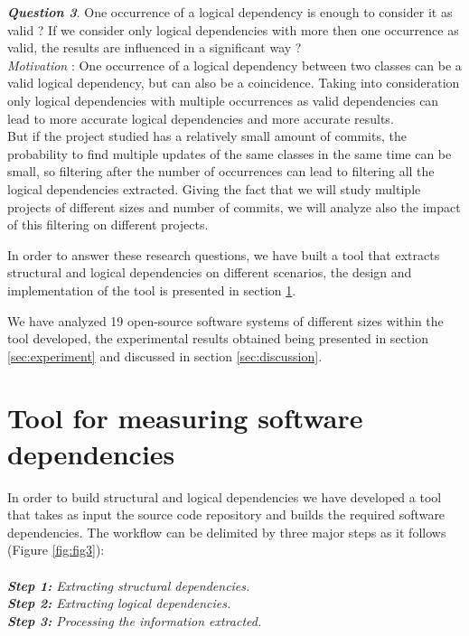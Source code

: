 \documentclass[conference]{IEEEtran}
\begin{document}
\textit{\textbf{Question 3}}. One occurrence of a logical dependency is enough to consider it as valid ? If we consider only logical dependencies with more then one occurrence as valid, the results are influenced in a significant way ?\\
\textit{Motivation} : One occurrence of a logical dependency between two classes can be a valid logical dependency, but can also be a coincidence. Taking into consideration only logical dependencies with multiple occurrences as valid dependencies can lead to more accurate logical dependencies and more accurate results.\\ But if the project studied has a relatively small amount of commits, the probability to find multiple updates of the same classes in the same time can be small, so filtering after the number of occurrences can lead to filtering all the logical dependencies extracted. Giving the fact that we will study multiple projects of different sizes and number of commits, we will analyze also the impact of this filtering on different projects.

In order to answer these research questions, we have built a tool that extracts structural and logical dependencies on different scenarios, the design and implementation of the tool is presented in section \ref{sec:tool}.

We have analyzed 19 open-source software systems of different sizes within the tool developed, the experimental results obtained being presented in section \ref{sec:experiment} and discussed in section \ref{sec:discussion}.
 




\section{Tool for measuring software dependencies}
\label{sec:tool}

In order to build structural and logical dependencies we have developed a tool that takes as input the source code repository and builds the required software dependencies. The workflow can be delimited by three major steps as it follows (Figure \ref{fig:fig3}):\\ \\
\textit{\textbf{Step 1:} Extracting structural dependencies.}\\
\textit{\textbf{Step 2:} Extracting logical dependencies.}\\
\textit{\textbf{Step 3:} Processing the information extracted.}
\end{document}
